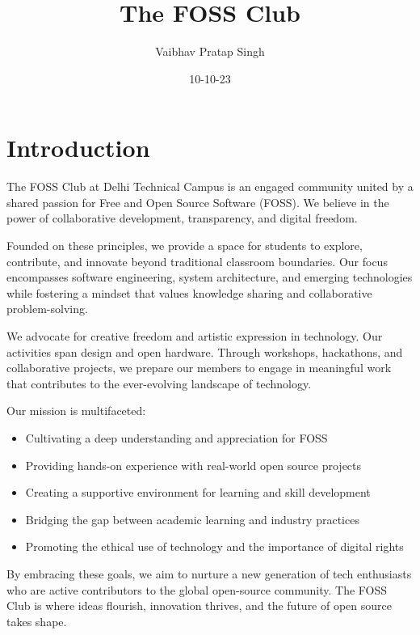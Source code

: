 \documentclass[12pt,a4paper]{article}
\title{\textbf{The FOSS Club}}
\author{Vaibhav Pratap Singh}
\date{10-10-23}
\begin{document}
\maketitle

\section{Introduction}

The FOSS Club at Delhi Technical Campus is an engaged community united by a shared passion for Free and Open Source Software (FOSS). We believe in the power of collaborative development, transparency, and digital freedom.

\vspace{5pt}

Founded on these principles, we provide a space for students to explore, contribute, and innovate beyond traditional classroom boundaries. Our focus encompasses software engineering, system architecture, and emerging technologies while fostering a mindset that values knowledge sharing and collaborative problem-solving.

\vspace{5pt}

We advocate for creative freedom and artistic expression in technology. Our activities span design and open hardware. Through workshops, hackathons, and collaborative projects, we prepare our members to engage in meaningful work that contributes to the ever-evolving landscape of technology.

\vspace{7pt}

Our mission is multifaceted: \begin{itemize} \item Cultivating a deep understanding and appreciation for FOSS \item Providing hands-on experience with real-world open source projects \item Creating a supportive environment for learning and skill development \item Bridging the gap between academic learning and industry practices \item Promoting the ethical use of technology and the importance of digital rights \end{itemize}

By embracing these goals, we aim to nurture a new generation of tech enthusiasts who are active contributors to the global open-source community. The FOSS Club is where ideas flourish, innovation thrives, and the future of open source takes shape.
\end{document}
